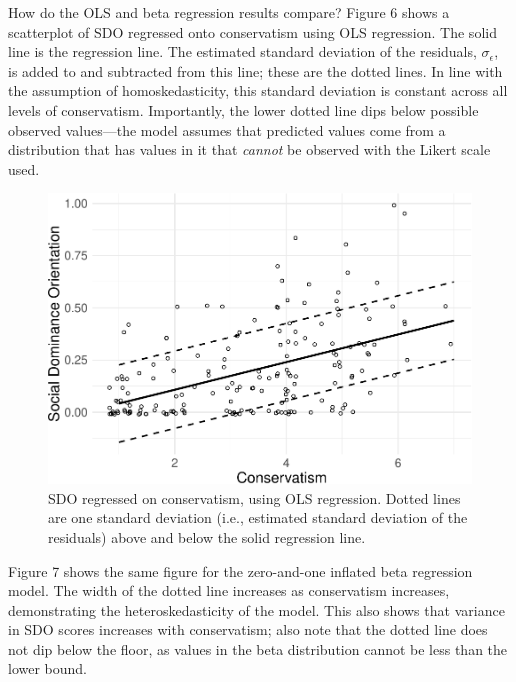\documentclass[english,man]{apa6}
\theoremstyle{definition}
\theoremstyle{definition}
\theoremstyle{remark}
\begin{document}
How do the OLS and beta regression results compare? Figure 6 shows a
scatterplot of SDO regressed onto conservatism using OLS regression. The
solid line is the regression line. The estimated standard deviation of
the residuals, \(\sigma_\epsilon\), is added to and subtracted from this
line; these are the dotted lines. In line with the assumption of
homoskedasticity, this standard deviation is constant across all levels
of conservatism. Importantly, the lower dotted line dips below possible
observed values---the model assumes that predicted values come from a
distribution that has values in it that \emph{cannot} be observed with
the Likert scale used.

\begin{figure}
\centering
\includegraphics{beta_hurdle_files/figure-latex/unnamed-chunk-18-1.pdf}
\caption{\label{fig:unnamed-chunk-18}SDO regressed on conservatism, using
OLS regression. Dotted lines are one standard deviation (i.e., estimated
standard deviation of the residuals) above and below the solid
regression line.}
\end{figure}

Figure 7 shows the same figure for the zero-and-one inflated beta
regression model. The width of the dotted line increases as conservatism
increases, demonstrating the heteroskedasticity of the model. This also
shows that variance in SDO scores increases with conservatism; also note
that the dotted line does not dip below the floor, as values in the beta
distribution cannot be less than the lower bound.
\end{document}
